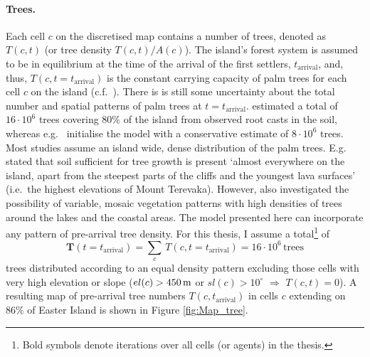 \paragraph{Trees.}
Each cell $c$ on the discretised map contains a number of trees, denoted as $T(c,t)$ (or tree density $T(c,t)/A(c)$).
The island's forest system is assumed to be in equilibrium at the time of the arrival of the first settlers, $t_\text{arrival}$, and, thus, $T(c,t=t_\text{arrival})$ is the constant carrying capacity of palm trees for each cell $c$ on the island (c.f.\ ).
There is is still some uncertainty about the total number and spatial patterns of palm trees at $t=t_\text{arrival}$.
\citet{Mieth2015} estimated a total of $16\cdot 10^6$ trees covering $80\%$ of the island from observed root casts in the soil, whereas e.g.\ \citet{Brandt2015} initialise the model with a conservative estimate of $8\cdot 10^6$ trees. 
Most studies assume an island wide, dense distribution of the palm trees. 
E.g.\ \citet{Bahn2017} stated that soil sufficient for tree growth is present `almost everywhere on the island, apart from the steepest parts of the cliffs and the youngest lava surfaces' (i.e.\ the highest elevations of Mount Terevaka). 
However, \citet{Rull2020} also investigated the possibility of variable, mosaic vegetation patterns with high densities of trees around the lakes and the coastal areas.
The model presented here can incorporate any pattern of pre-arrival tree density. 
For this thesis, I assume a total\footnote{Bold symbols denote iterations over all cells (or agents) in the thesis.} of 
\begin{equation}
\mathbf{T}(t=t_\text{arrival}) = \sum_{c} \, T(c,t=t_\text{arrival}) =  16 \cdot 10^6 \, \text{trees}
\end{equation} 
trees distributed according to an equal density pattern excluding those cells with very high elevation or slope ($el(c)>450\, {\rm m}$ or $sl(c)>10^\circ$ $\Rightarrow$ $T(c,t) = 0$).
A resulting map of pre-arrival tree numbers $T(c,t_\text{arrival})$ in cells $c$ extending on $86\%$ of Easter Island is shown in Figure \ref{fig:Map_tree}.

